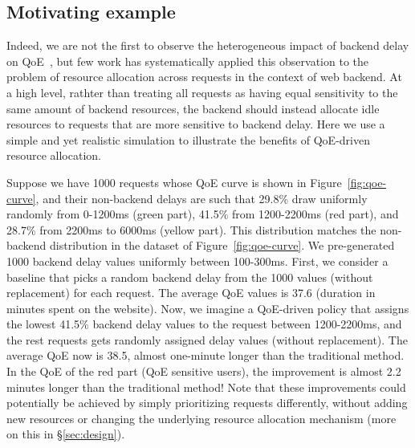 \subsection{Motivating example}
\label{subsec:example}
Indeed, we are not the first to observe the heterogeneous impact of backend delay on QoE~\cite{timeciard,dqbarge,??,??}, but few work has systematically applied this observation to the problem of resource allocation across requests in the context of web backend.
At a high level, rathter than treating all requests as having equal sensitivity to the same amount of backend resources, the backend should instead allocate idle resources to requests that are more sensitive to backend delay.
Here we use a simple and yet realistic simulation to illustrate the benefits of QoE-driven resource allocation.


Suppose we have 1000 requests whose QoE curve is shown in Figure~\ref{fig:qoe-curve}, and their non-backend delays are such that 29.8\% draw uniformly randomly from 0-1200ms (green part), 41.5\% from 1200-2200ms (red part), and 28.7\% from 2200ms to 6000ms (yellow part). This distribution matches the non-backend distribution in the dataset of Figure~\ref{fig:qoe-curve}.
We pre-generated 1000 backend delay values uniformly between 100-300ms. 
First, we consider a baseline that picks a random backend delay from the 1000 values (without replacement) for each request. The average QoE values is 37.6 (duration in minutes spent on the website).
Now, we imagine a QoE-driven policy that assigns the lowest 41.5\% backend delay values to the request between 1200-2200ms, and the rest requests gets randomly assigned delay values (without replacement). 
The average QoE now is 38.5, almost one-minute longer than the traditional method. In the QoE of the red part (QoE sensitive users), the improvement is almost 2.2 minutes longer than the traditional method!
Note that these improvements could potentially be achieved by simply prioritizing requests differently, without adding new resources or changing the underlying resource allocation mechanism (more on this in \S\ref{sec:design}).

